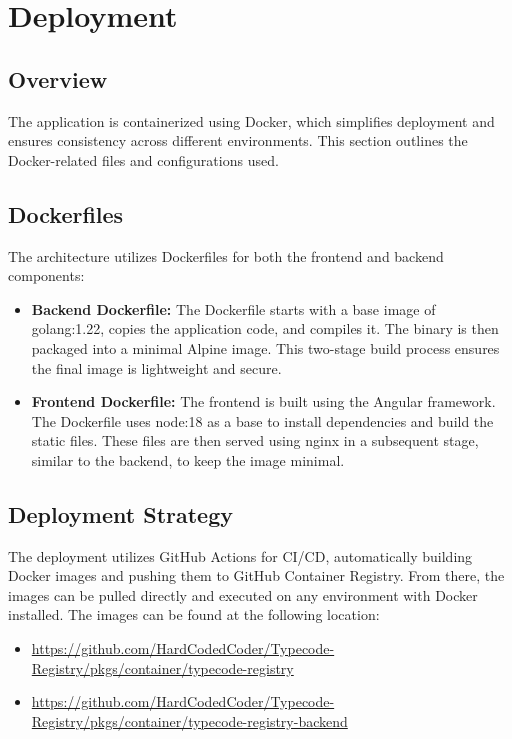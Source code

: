 \section{Deployment}\label{sec:deployment}

\subsection{Overview}\label{subsec:overview}
The application is containerized using Docker, which simplifies deployment and ensures consistency across different environments.
This section outlines the Docker-related files and configurations used.

\subsection{Dockerfiles}\label{subsec:dockerfiles}
The architecture utilizes Dockerfiles for both the frontend and backend components:

\begin{itemize}
    \item \textbf{Backend Dockerfile:}
    The Dockerfile starts with a base image of golang:1.22, copies the application code, and compiles it.
    The binary is then packaged into a minimal Alpine image.
    This two-stage build process ensures the final image is lightweight and secure.

    \item \textbf{Frontend Dockerfile:}
    The frontend is built using the Angular framework.
    The Dockerfile uses node:18 as a base to install dependencies and build the static files.
    These files are then served using nginx in a subsequent stage, similar to the backend, to keep the image minimal.
\end{itemize}

\subsection{Deployment Strategy}\label{subsec:deployment-strategy}
The deployment utilizes GitHub Actions for CI/CD, automatically building Docker images and pushing them to GitHub Container Registry.
From there, the images can be pulled directly and executed on any environment with Docker installed.
The images can be found at the following location:

\begin{itemize}
    \item \url{https://github.com/HardCodedCoder/Typecode-Registry/pkgs/container/typecode-registry}
    \item \url{https://github.com/HardCodedCoder/Typecode-Registry/pkgs/container/typecode-registry-backend}
\end{itemize}
